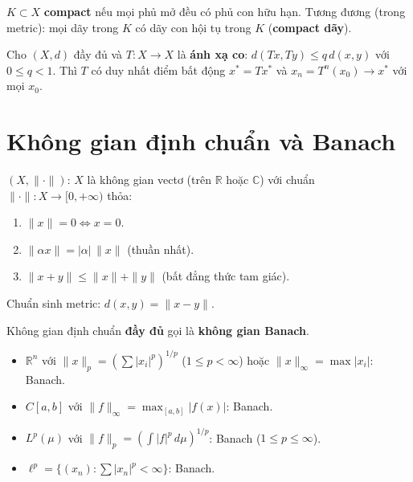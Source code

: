 \documentclass[12pt,a4paper]{article}
\begin{document}
\begin{dinhnghia}[title={Tập compact}]
  $K \subset X$ \textbf{compact} nếu mọi phủ mở đều có phủ con hữu hạn. Tương đương (trong metric): mọi dãy trong $K$ có dãy con hội tụ trong $K$ (\textbf{compact dãy}).
\end{dinhnghia}

\begin{dinhly}[title={Ánh xạ co --- Định lý Banach (điểm bất động)}]
  Cho $(X, d)$ đầy đủ và $T: X \to X$ là \textbf{ánh xạ co}: $d(Tx, Ty) \le q\,d(x, y)$ với $0 \le q < 1$. Thì $T$ có duy nhất điểm bất động $x^* = Tx^*$ và $x_n = T^n(x_0) \to x^*$ với mọi $x_0$.
\end{dinhly}

\section{Không gian định chuẩn và Banach}

\begin{dinhnghia}[title={Không gian định chuẩn}]
  $(X, \|\cdot\|)$: $X$ là không gian vectơ (trên $\mathbb{R}$ hoặc $\mathbb{C}$) với chuẩn $\|\cdot\|: X \to [0, +\infty)$ thỏa:
  \begin{enumerate}
    \item $\|x\| = 0 \Leftrightarrow x = 0$.
    \item $\|\alpha x\| = |\alpha|\,\|x\|$ (thuần nhất).
    \item $\|x + y\| \le \|x\| + \|y\|$ (bất đẳng thức tam giác).
  \end{enumerate}
  Chuẩn sinh metric: $d(x, y) = \|x - y\|$.
\end{dinhnghia}

\begin{dinhnghia}[title={Không gian Banach}]
  Không gian định chuẩn \textbf{đầy đủ} gọi là \textbf{không gian Banach}.
\end{dinhnghia}

\begin{vidu}
  \begin{itemize}
    \item $\mathbb{R}^n$ với $\|x\|_p = \left(\sum |x_i|^p\right)^{1/p}$ ($1 \le p < \infty$) hoặc $\|x\|_\infty = \max|x_i|$: Banach.
    \item $C[a, b]$ với $\|f\|_\infty = \max_{[a,b]}|f(x)|$: Banach.
    \item $L^p(\mu)$ với $\|f\|_p = \left(\int |f|^p\,d\mu\right)^{1/p}$: Banach ($1 \le p \le \infty$).
    \item $\ell^p = \{(x_n) : \sum |x_n|^p < \infty\}$: Banach.
  \end{itemize}
\end{vidu}
\end{document}
